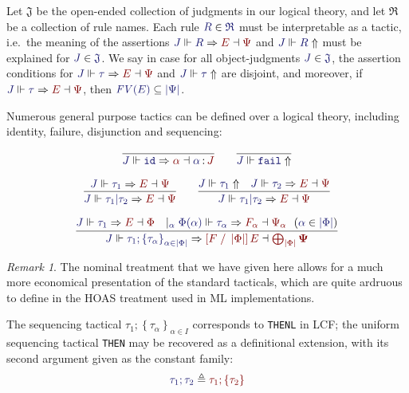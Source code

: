 \documentclass[11pt]{article}
\theoremstyle{definition}
\theoremstyle{remark}
\newtheorem{remark}[thm]{Remark}
\numberwithin{equation}{section}
\def\IModeColorName{MidnightBlue}
\def\OModeColorName{Maroon}
\newcommand\IMode[1]{{\color{\IModeColorName}{#1}}}
\newcommand\OMode[1]{{\color{\OModeColorName}{#1}}}
\newcommand\HypJ[2]{#1\ \ (#2)}
\newcommand\GenJ[2]{\vert_{\IMode{#1}}\; #2}
\newcommand\JJ{J}
\newcommand\RSet{\mathfrak{R}}
\newcommand\JSet{\mathfrak{J}}
\newcommand\IsTac[1]{\IMode{#1}\ \textit{tactic}}
\newcommand\MkSet[1]{\left\{#1\right\}}
\newcommand\MkFam[3]{\MkSet{#1_{#2}}_{#2\in #3}}
\newcommand\OSG[2]{\IMode{#1}\,{\color{Black}:}\,\OMode{#2}}
\newcommand\Refine[4]{\IMode{#1}\Vdash\IMode{#2}\Rightarrow\OMode{#4}\dashv\OMode{#3}}
\newcommand\NoRefine[2]{\IMode{#1}\Vdash\IMode{#2}\Uparrow}
\newcommand\Member[2]{\IMode{#1}\in\IMode{#2}}
\newcommand\IdTac{\mathtt{id}}
\newcommand\FailTac{\mathtt{fail}}
\newcommand\OrElseTac[2]{#1\vert#2}
\newcommand\ThenTac[2]{#1;#2}
\newcommand\Dom[1]{\left\vert#1\right\vert}
\newcommand\SubsetEq[2]{\IMode{#1}\subseteq\IMode{#2}}
\newcommand\FV[1]{\textit{FV}\left(#1\right)}
\newcommand\Subst[3]{\left[#1\;/\;#2\right]#3}
\begin{document}
Let $\JSet$ be the open-ended collection of judgments in our logical theory,
and let $\RSet$ be a collection of rule names. Each rule $\Member{R}{\RSet}$
must be interpretable as a tactic, i.e.\ the meaning of the assertions
$\Refine{\JJ}{R}{\Psi}{E}$ and $\NoRefine{\JJ}{R}$ must be explained for
$\Member{J}{\JSet}$. We say \framebox{$\IsTac{\tau}$} in case for all object-judgments
$\Member{\JJ}{\JSet}$, the assertion conditions for
$\Refine{\JJ}{\tau}{\Psi}{E}$ and $\NoRefine{\JJ}{\tau}$ are disjoint, and
moreover, if $\Refine{\JJ}{\tau}{\Psi}{E}$, then
$\SubsetEq{\FV{E}}{\Dom{\Psi}}$.

Numerous general purpose tactics can be defined over a logical theory,
including identity, failure, disjunction and sequencing:

\begin{gather*}
  \infer{
    \Refine{\JJ}{\IdTac}{\OSG{\alpha}{\JJ}}{\alpha}
  }{
  }
  \qquad
  \infer{
    \NoRefine{\JJ}{\FailTac}
  }{
  }\\[6pt]
  \infer{
    \Refine{\JJ}{\OrElseTac{\tau_1}{\tau_2}}{\Psi}{E}
  }{
    \Refine{\JJ}{\tau_1}{\Psi}{E}
  }
  \qquad
  \infer{
    \Refine{\JJ}{\OrElseTac{\tau_1}{\tau_2}}{\Psi}{E}
  }{
    \NoRefine{\JJ}{\tau_1} &
    \Refine{\JJ}{\tau_2}{\Psi}{E}
  }\\[6pt]
  \infer{
    \Refine{\JJ}{\ThenTac{\tau_1}{\MkFam{\tau}{\alpha}{\Dom\Phi}}}{\bigoplus_{\Dom\Phi}\mathbf\Psi}{\Subst{F}{\Dom\Phi}{E}}
  }{
    \Refine{\JJ}{\tau_1}{\Phi}{E} &
    \GenJ{\alpha}{
      \HypJ{
        \Refine{\Phi(\alpha)}{\tau_\alpha}{\Psi_\alpha}{F_\alpha}
      }{
        \Member{\alpha}{\Dom\Phi}
      }
    }
  }
\end{gather*}

\begin{remark}
  The nominal treatment that we have given here allows for a much more
  economical presentation of the standard tacticals, which are quite ardruous
  to define in the HOAS treatment used in ML implementations.
\end{remark}

The sequencing tactical
$\ThenTac{\tau_1}{\MkFam{\tau}{\alpha}{I}}$ corresponds to
\verb!THENL! in LCF; the uniform sequencing tactical \verb!THEN! may be
recovered as a definitional extension, with its second argument given as the
constant family:
\[
    \IMode{\ThenTac{\tau_1}{\tau_2}}
    \triangleq
    \OMode{\ThenTac{\tau_1}{\MkSet{\tau_2}}}
\]
\end{document}
